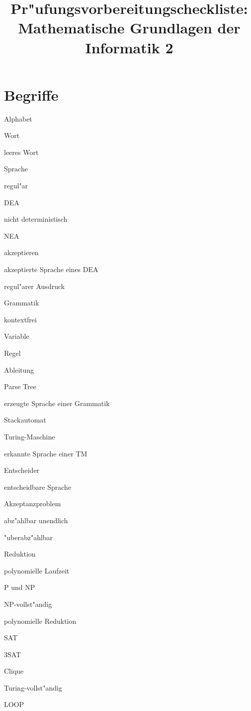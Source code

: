 \documentclass[a4paper,12pt,twocolumn]{article}
\begin{document}
\title{Pr"ufungsvorbereitungscheckliste:\\ Mathematische Grundlagen der Informatik 2}
\date{}
\maketitle
\section{Begriffe}
\begin{compactenum}
\item Alphabet
\item Wort
\item leeres Wort
\item Sprache
\item regul"ar
\item DEA
\item nicht deterministisch
\item NEA
\item akzeptieren
\item akzeptierte Sprache eines DEA
\item regul"arer Ausdruck
\item Grammatik
\item kontextfrei
\item Variable
\item Regel
\item Ableitung
\item Parse Tree
\item erzeugte Sprache einer Grammatik
\item Stackautomat
\item Turing-Maschine
\item erkannte Sprache einer TM
\item Entscheider
\item entscheidbare Sprache
\item Akzeptanzproblem
\item abz"ahlbar unendlich
\item "uberabz"ahlbar
\item Reduktion
\item polynomielle Laufzeit
\item P und NP
\item NP-vollst"andig
\item polynomielle Reduktion
\item SAT
\item 3SAT
\item Clique
\item Turing-vollst"andig
\item LOOP
\end{compactenum}
\vfill
\end{document}
